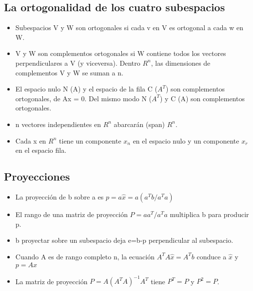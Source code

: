 \documentclass[]{article}
\begin{document}
\subsection{La ortogonalidad de los cuatro subespacios}
\begin{itemize}
	\item Subespacios V y W son ortogonales si cada v en V es ortogonal a cada w en W.
	\item V y W son complementos ortogonales si W contiene todos los vectores perpendiculares a V (y viceversa). Dentro $R^{n}$, las dimensiones de complementos V y W se suman a n.
	\item El espacio nulo N (A) y el espacio de la fila C ($A^{T}$) son complementos ortogonales, de Ax = 0. Del mismo modo N ($A^{T}$) y C (A) son complementos ortogonales.
	\item n vectores independientes en $R^{n}$ abarcarán (span) $R^{n}$.
	\item Cada x en $R^{n}$ tiene un componente $x_{n}$ en el espacio nulo y un componente $x_{r}$ en el  espacio fila.
\end{itemize}

\subsection{Proyecciones}
\begin{itemize}
	\item La proyección de b sobre a es $p=a\widehat{x}=a(a^{T}b/a^{T}a)$
	\item El rango de una matriz de proyección $P=aa^{T}/a^{T}a$ multiplica b para producir p.
	\item b proyectar sobre un subespacio deja e=b-p perpendicular al subespacio.
	\item Cuando A es de rango completo n, la ecuación $A^{T}A\widehat{x} = A^{T}b$ conduce a $\widehat{x}$ y $p = A\widehat{x}$
	\item La matriz de proyección $P=A(A^{T}A)^{-1}A^{T}$ tiene $P^{T}=P$ y $P^{2}=P$.
\end{itemize}
\end{document}
